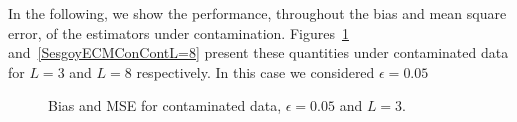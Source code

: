\documentclass[twocolumn]{svjour3}
\begin{document}
%
In the following, we show the performance, throughout the bias and mean square error, of the estimators under contamination. 
Figures~\ref{SesgoyECMConContL=3} and~\ref{SesgoyECMConContL=8} present these quantities under contaminated data for $L=3$ and $L=8$ respectively. In this case we considered $\epsilon=0.05$

\begin{figure}[htb]
	\centering
	\caption{\label{SesgoyECMConContL=3}\small Bias and MSE for contaminated data,  $\epsilon=0.05$ and $ L=3$.}
\end{figure}
\end{document}
